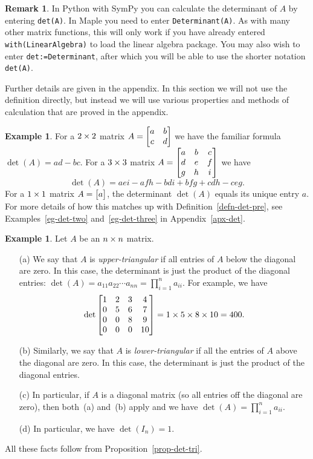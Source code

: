 \documentclass[reqno]{amsart}
\theoremstyle{definition}
\newtheorem{remark}[theorem]{Remark}
\newtheorem{example}[theorem]{Example}
\newcommand{\dfn}[1]{\emph{{#1}}\index{#1}}
\begin{document}
\begin{remark}
 In Python with SymPy you can calculate the determinant of $A$ by
 entering \verb|det(A)|.  In Maple you need to enter 
 \verb+Determinant(A)+.  As with many other matrix functions, this
 will only work if you have already entered \verb+with(LinearAlgebra)+
 to load the linear algebra package.  You may also wish to enter
 \verb+det:=Determinant+, after which you will be able to use the
 shorter notation \verb+det(A)+.  
\end{remark}

Further details are given in the appendix.  In this section we will
not use the definition directly, but instead we will use various
properties and methods of calculation that are proved in the
appendix.

\begin{example}\label{eg-det-small}
 For a $2\times 2$ matrix $A=\left[\begin{matrix} a&b\\c&d\end{matrix}\right]$ we have the familiar
 formula $\det(A)=ad-bc$.  For a $3\times 3$ matrix
 $A=\left[\begin{matrix} a&b&c\\ d&e&f\\ g&h&i\end{matrix}\right]$ we have
 \[ \det(A) = aei - afh - bdi + bfg + cdh - ceg. \]
 For a $1\times 1$ matrix $A = \left[\begin{matrix} a \end{matrix}\right]$, the determinant
 $\det(A)$ equals its unique entry $a$.
 For more details of how this matches up with
 Definition~\ref{defn-det-pre}, see Examples~\ref{eg-det-two}
 and~\ref{eg-det-three} in Appendix~\ref{apx-det}.
\end{example}

\begin{example}\label{eg-det-tri}
 Let $A$ be an $n\times n$ matrix.
 \begin{itemize}
  \item[(a)] We say that $A$ is
   \dfn{upper-triangular} if all entries of $A$ below the diagonal
   are zero. In this case, the
   determinant is just the product of the diagonal entries:
   $\det(A)=a_{11}a_{22}\dotsb a_{nn}=\prod_{i=1}^na_{ii}$.  For
   example, we have
   \[ \det\left[\begin{matrix} 1&2&3&4 \\ 0&5&6&7 \\ 0&0&8&9 \\ 0&0&0&10\end{matrix}\right] =
       1 \times 5 \times 8 \times 10 = 400.
   \]
  \item[(b)] Similarly, we say that $A$ is \dfn{lower-triangular}
   if all the entries of $A$ above the diagonal are
   zero. In this case, the determinant is just the product of the
   diagonal entries.
  \item[(c)] In particular, if $A$ is a diagonal matrix (so all
   entries off the diagonal are zero), then both~(a) and~(b) apply and
   we have $\det(A)=\prod_{i=1}^na_{ii}$.
  \item[(d)] In particular, we have $\det(I_n)=1$.
 \end{itemize}
 All these facts follow from Proposition~\ref{prop-det-tri}.
\end{example}
\end{document}
